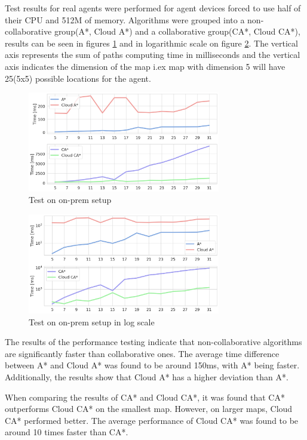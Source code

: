 Test results for real agents were performed for agent devices forced to use half of their CPU and 512M of memory. Algorithms were grouped into a non-collaborative group(A*, Cloud A*) and a collaborative group(CA*, Cloud CA*), results can be seen in figures \ref{fig:on_prem_test_time} and in logarithmic scale on figure \ref{fig:on_prem_test_time_log}. The vertical axis represents the sum of paths computing time in milliseconds and the vertical axis indicates the dimension of the map i.ex map with dimension 5 will have 25(5x5) possible locations for the agent.

\begin{figure}[H]
    \centering
    \includegraphics[width=0.75\textwidth]{pictures/on_prem_test_time.png}
    \caption{Test on on-prem setup}
    \label{fig:on_prem_test_time}
\end{figure}
\begin{figure}[H]
    \centering
    \includegraphics[width=0.75\textwidth]{pictures/on_prem_test_time_log.png}
    \caption{Test on on-prem setup in log scale}
    \label{fig:on_prem_test_time_log}
\end{figure}

The results of the performance testing indicate that non-collaborative algorithms are significantly faster than collaborative ones. The average time difference between A* and Cloud A* was found to be around 150ms, with A* being faster. Additionally, the results show that Cloud A* has a higher deviation than A*.

When comparing the results of CA* and Cloud CA*, it was found that CA* outperforms Cloud CA* on the smallest map. However, on larger maps, Cloud CA* performed better. The average performance of Cloud CA* was found to be around 10 times faster than CA*.